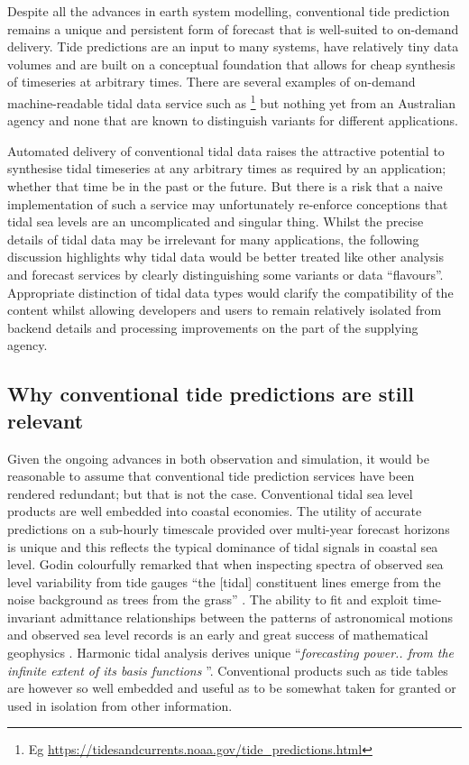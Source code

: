 Despite all the advances in earth system modelling, conventional tide prediction remains a unique and persistent form of forecast that is well-suited to on-demand delivery.  Tide predictions are an input to many systems, have relatively tiny data volumes and are built on a conceptual foundation that allows for cheap synthesis of timeseries at arbitrary times.    There are several examples of on-demand machine-readable tidal data service such as  \footnote{Eg \url{https://tidesandcurrents.noaa.gov/tide_predictions.html}} but nothing yet from an Australian agency and none that are known to distinguish variants for different applications.


Automated delivery of conventional tidal data raises the attractive potential to synthesise tidal timeseries at any arbitrary times as required by an application; whether that time be in the past or the future.   But there is a risk that a naive implementation of such a service may unfortunately re-enforce conceptions that tidal sea levels are an uncomplicated and singular thing.    
Whilst the precise details of tidal data may be irrelevant for many applications, the following discussion highlights why tidal data would be better treated like other analysis and forecast services by clearly distinguishing some variants or data ``flavours''. 
Appropriate distinction of tidal data types would clarify the compatibility of the content whilst allowing developers and users to remain relatively isolated from backend details and processing improvements on the part of the supplying agency.

\subsection{Why conventional tide predictions are still relevant}
Given the ongoing advances in both observation and simulation, it would be reasonable to assume that conventional tide prediction services have been rendered redundant; but that is not the case. 
Conventional tidal sea level products are well embedded into coastal economies.   The utility of accurate predictions on a sub-hourly timescale provided over multi-year forecast horizons is unique and this reflects the typical dominance of tidal signals in coastal sea level.
Godin colourfully remarked that when inspecting spectra of observed sea level variability from tide gauges ``the [tidal] constituent lines emerge from the noise background as trees from the grass'' \cite{godin:1972}.
The ability to fit and exploit time-invariant admittance relationships between the patterns of astronomical motions and observed sea level records is an early and great success of mathematical geophysics \cite{Cartwright:2000tt}.  Harmonic tidal analysis derives unique ``\textit{forecasting power.. from the infinite extent of its basis functions} ''\citep{Flinchem:2000kp}.
Conventional products such as tide tables are however so well embedded and useful as to be somewhat taken for granted or used in isolation from other information. 

